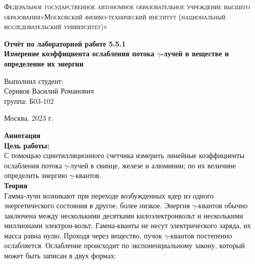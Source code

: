 \documentclass[a4paper, 12pt]{article}%
\begin{document}
	\begin{titlepage}
		\begin{center}
			\textsc{Федеральное государственное автономное образовательное учреждение высшего образования«Московский физико-технический институт (национальный исследовательский университет)»\\[5mm]
			}
			
			\vfill
			
			\textbf{Отчёт по лабораторной работе 5.5.1\\[3mm]
				Измерение коэффициента ослабления потока $ \gamma $-лучей в веществе и определение их энергии
				\\[50mm]
			}
			
		\end{center}
		
		\hfill
		\begin{minipage}{.5\textwidth}
			Выполнил студент:\\[2mm]
			Сериков Василий Романович\\[2mm]
			группа: Б03-102\\[5mm]
			
		\end{minipage}
		\vfill
		\begin{center}
			Москва, 2023 г.
		\end{center}
		
	\end{titlepage}
	
	\newpage
	\setcounter{page}{2}
	\textbf{Аннотация}\\
	
	\textbf{Цель работы: }\\
	
	С помощью сцинтилляционного счетчика измерить линейные коэффициенты ослабления потока $ \gamma $-лучей в свинце, железе и алюминии; по их величине определить энергию $ \gamma $-квантов.\\
	
	\textbf{Теория}\\
	
	Гамма-лучи возникают при переходе возбужденных ядер из одного энергетического состояния в другое, более низкое. Энергия $ \gamma $-квантов обычно заключена между несколькими десятками килоэлектронвольт и несколькими миллионами электрон-вольт. Гамма-кванты не несут электрического заряда, их масса равна нулю. Проходя через вещество, пучок $ \gamma $-квантов постепенно ослабляется. Ослабление происходит по экспоненциальному закону, который может быть записан в двух формах:
	
\end{document}
